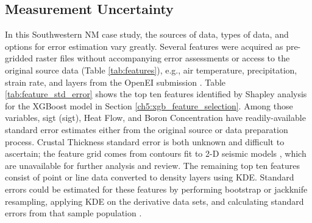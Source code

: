 \subsection{Measurement Uncertainty}\label{ch5:measure_uncertainty}
In this Southwestern NM case study, the sources of data, types of data, and options for error estimation vary greatly. Several features were acquired as pre-gridded raster files without accompanying error assessments or access to the original source data (Table \ref{tab:features}), e.g., air temperature, precipitation, strain rate, and layers from the \citeauthor{bielicki_hydrogeolgic_2015} OpenEI submission \citep{kelley_geothermal_2015}. Table \ref{tab:feature_std_error} shows the top ten features identified by Shapley analysis for the XGBoost model in Section \ref{ch5:xgb_feature_selection}. Among those variables, \acrlong{sigt} (\acrshort{sigt}), Heat Flow, and Boron Concentration have readily-available standard error estimates either from the original source or data preparation process. Crustal Thickness standard error is both unknown and difficult to ascertain; the feature grid comes from contours fit to 2-D seismic models \citep{keller_comparative_1991}, which are unavailable for further analysis and review. The remaining top ten features consist of point or line data converted to density layers using KDE. Standard errors could be estimated for these features by performing bootstrap or jackknife resampling, applying KDE on the derivative data sets, and calculating standard errors from that sample population .

